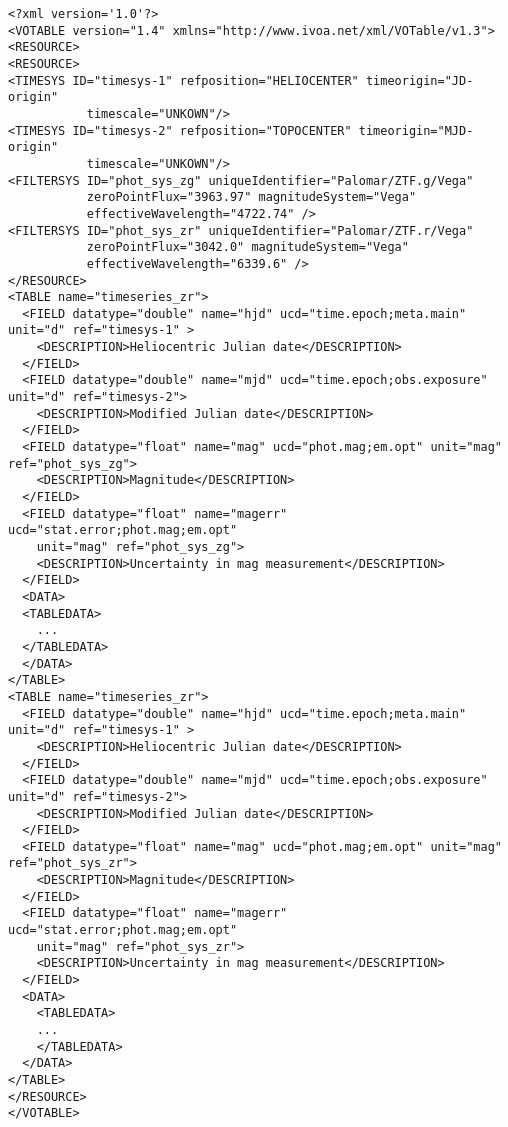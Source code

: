 \begin{verbatim}
<?xml version='1.0'?>
<VOTABLE version="1.4" xmlns="http://www.ivoa.net/xml/VOTable/v1.3">
<RESOURCE>
<RESOURCE>
<TIMESYS ID="timesys-1" refposition="HELIOCENTER" timeorigin="JD-origin" 
           timescale="UNKOWN"/>
<TIMESYS ID="timesys-2" refposition="TOPOCENTER" timeorigin="MJD-origin" 
           timescale="UNKOWN"/>
<FILTERSYS ID="phot_sys_zg" uniqueIdentifier="Palomar/ZTF.g/Vega" 
           zeroPointFlux="3963.97" magnitudeSystem="Vega" 
           effectiveWavelength="4722.74" />
<FILTERSYS ID="phot_sys_zr" uniqueIdentifier="Palomar/ZTF.r/Vega" 
           zeroPointFlux="3042.0" magnitudeSystem="Vega" 
           effectiveWavelength="6339.6" />
</RESOURCE>
<TABLE name="timeseries_zr">
  <FIELD datatype="double" name="hjd" ucd="time.epoch;meta.main" unit="d" ref="timesys-1" >
    <DESCRIPTION>Heliocentric Julian date</DESCRIPTION>
  </FIELD>
  <FIELD datatype="double" name="mjd" ucd="time.epoch;obs.exposure" unit="d" ref="timesys-2">
    <DESCRIPTION>Modified Julian date</DESCRIPTION>
  </FIELD>
  <FIELD datatype="float" name="mag" ucd="phot.mag;em.opt" unit="mag" ref="phot_sys_zg">
    <DESCRIPTION>Magnitude</DESCRIPTION>
  </FIELD>
  <FIELD datatype="float" name="magerr" ucd="stat.error;phot.mag;em.opt" 
    unit="mag" ref="phot_sys_zg">
    <DESCRIPTION>Uncertainty in mag measurement</DESCRIPTION>
  </FIELD>
  <DATA>
  <TABLEDATA>
    ...
  </TABLEDATA>
  </DATA>
</TABLE>
<TABLE name="timeseries_zr">
  <FIELD datatype="double" name="hjd" ucd="time.epoch;meta.main" unit="d" ref="timesys-1" >
    <DESCRIPTION>Heliocentric Julian date</DESCRIPTION>
  </FIELD>
  <FIELD datatype="double" name="mjd" ucd="time.epoch;obs.exposure" unit="d" ref="timesys-2">
    <DESCRIPTION>Modified Julian date</DESCRIPTION>
  </FIELD>
  <FIELD datatype="float" name="mag" ucd="phot.mag;em.opt" unit="mag" ref="phot_sys_zr">
    <DESCRIPTION>Magnitude</DESCRIPTION>
  </FIELD>
  <FIELD datatype="float" name="magerr" ucd="stat.error;phot.mag;em.opt" 
    unit="mag" ref="phot_sys_zr">
    <DESCRIPTION>Uncertainty in mag measurement</DESCRIPTION>
  </FIELD>
  <DATA>
    <TABLEDATA>
    ...
    </TABLEDATA>
  </DATA>
</TABLE>
</RESOURCE>
</VOTABLE>
\end{verbatim}
